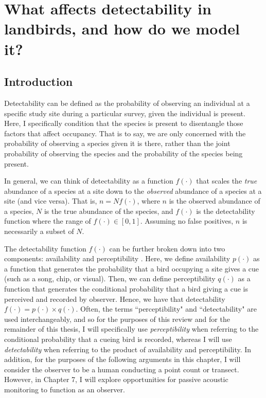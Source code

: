 \chapter{What affects detectability in landbirds, and how do we model it?}

\section{Introduction}

\par Detectability can be defined as the probability of observing an individual at a specific study site during a particular survey, given the individual is present.
Here, I specifically condition that the species is present to disentangle those factors that affect occupancy.
That is to say, we are only concerned with the probability of observing a species given it is there, rather than the joint probability of observing the species and the probability of the species being present.

\par In general, we can think of detectability as a function $f(\cdot)$ that scales the \textit{true} abundance of a species at a site down to the \textit{observed} abundance of a species at a site (and vice versa). 
That is, $n = Nf(\cdot)$, where $n$ is the observed abundance of a species, $N$ is the true abundance of the species, and $f(\cdot)$ is the detectability function where the range of $f(\cdot) \in [0,1]$.
Assuming no false positives, $n$ is necessarily a subset of $N$.

\par The detectability function $f(\cdot)$ can be further broken down into two components: availability and perceptibility \citep{marsh_correcting_1989}.
Here, we define availability $p(\cdot)$ as a function that generates the probability that a bird occupying a site gives a cue (such as a song, chip, or visual).
Then, we can define perceptibility $q(\cdot)$ as a function that generates the conditional probability that a bird giving a cue is perceived and recorded by observer.
Hence, we have that detectability $f(\cdot) = p(\cdot) \times q(\cdot)$.
Often, the terms ``perceptibility" and ``detectability" are used interchangeably, and so for the purposes of this review and for the remainder of this thesis, I will specifically use \textit{perceptibility} when referring to the conditional probability that a cueing bird is recorded, whereas I will use \textit{detectability} when referring to the product of availability and perceptibility.
In addition, for the purposes of the following arguments in this chapter, I will consider the observer to be a human conducting a point count or transect. However, in Chapter 7, I will explore opportunities for passive acoustic monitoring to function as an observer.

